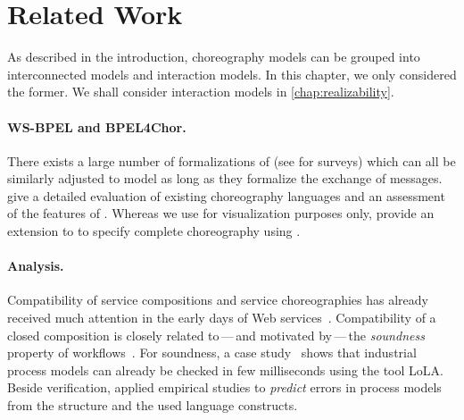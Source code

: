 \section{Related Work}\label{sec:ver:related}

As described in the introduction, choreography models can be grouped into interconnected models and interaction models. In this chapter, we only considered the former. We shall consider interaction models in \autoref{chap:realizability}.


\paragraph{WS-BPEL and BPEL{\footnotesize 4}Chor.}

There exists a large number of formalizations of\break {} (see \cite{BreugelK2006,LohmannVOSA_2009_ijbpim,LohmannVD_2008_topnoc} for surveys) which can all be similarly adjusted to model \bpelchor{} as long as they formalize the exchange of messages. \citet{DeckerKLW_2009_dke} give a detailed evaluation of existing choreography languages and an assessment of the features of \bpelchor{}. Whereas we use  for visualization purposes only, \citet{DeckerKLPW_2008_caise} provide an extension to  to specify complete \bpelchor{} choreography using .


\paragraph{Analysis.}

Compatibility of service compositions and service choreographies has already received much attention in the early days of Web services~\cite{YellinS_1997_toplas,NarayananM_2002_www,Rachid-Hamadi_2003_adc,BultanFHS_2003_www,Foster_UMK04_icws,Martens_2005_fase, PuhlmannW_2006_icsoc,DeckerW_2007_caise}. Compatibility of a closed composition is closely related to\,---\,and motivated by\,---\,the \emph{soundness} property of workflows~\cite{Aalst_1998_jcsc,VerbeekBA_2001_tcj}. For soundness, a case study~\cite{FahlandWJKLVW_2009_bpm} shows that industrial process models can already be checked in few milliseconds using the tool LoLA. Beside verification, \citet{Mendling_2008_phd} applied empirical studies to \emph{predict} errors in process models from the structure and the used language constructs.

